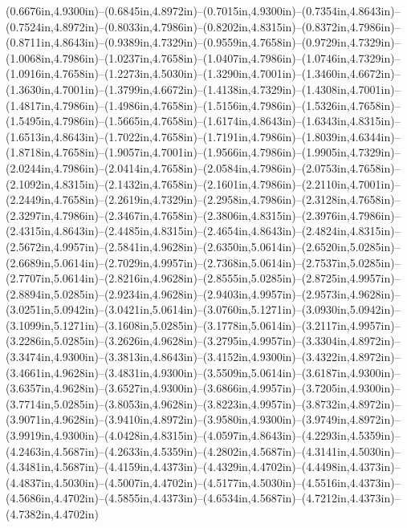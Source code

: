 (0.6676in,4.9300in)--(0.6845in,4.8972in)--(0.7015in,4.9300in)--(0.7354in,4.8643in)--(0.7524in,4.8972in)--(0.8033in,4.7986in)--(0.8202in,4.8315in)--(0.8372in,4.7986in)--(0.8711in,4.8643in)--(0.9389in,4.7329in)--(0.9559in,4.7658in)--(0.9729in,4.7329in)--(1.0068in,4.7986in)--(1.0237in,4.7658in)--(1.0407in,4.7986in)--(1.0746in,4.7329in)--(1.0916in,4.7658in)--(1.2273in,4.5030in)--(1.3290in,4.7001in)--(1.3460in,4.6672in)--(1.3630in,4.7001in)--(1.3799in,4.6672in)--(1.4138in,4.7329in)--(1.4308in,4.7001in)--(1.4817in,4.7986in)--(1.4986in,4.7658in)--(1.5156in,4.7986in)--(1.5326in,4.7658in)--(1.5495in,4.7986in)--(1.5665in,4.7658in)--(1.6174in,4.8643in)--(1.6343in,4.8315in)--(1.6513in,4.8643in)--(1.7022in,4.7658in)--(1.7191in,4.7986in)--(1.8039in,4.6344in)--(1.8718in,4.7658in)--(1.9057in,4.7001in)--(1.9566in,4.7986in)--(1.9905in,4.7329in)--(2.0244in,4.7986in)--(2.0414in,4.7658in)--(2.0584in,4.7986in)--(2.0753in,4.7658in)--(2.1092in,4.8315in)--(2.1432in,4.7658in)--(2.1601in,4.7986in)--(2.2110in,4.7001in)--(2.2449in,4.7658in)--(2.2619in,4.7329in)--(2.2958in,4.7986in)--(2.3128in,4.7658in)--(2.3297in,4.7986in)--(2.3467in,4.7658in)--(2.3806in,4.8315in)--(2.3976in,4.7986in)--(2.4315in,4.8643in)--(2.4485in,4.8315in)--(2.4654in,4.8643in)--(2.4824in,4.8315in)--(2.5672in,4.9957in)--(2.5841in,4.9628in)--(2.6350in,5.0614in)--(2.6520in,5.0285in)--(2.6689in,5.0614in)--(2.7029in,4.9957in)--(2.7368in,5.0614in)--(2.7537in,5.0285in)--(2.7707in,5.0614in)--(2.8216in,4.9628in)--(2.8555in,5.0285in)--(2.8725in,4.9957in)--(2.8894in,5.0285in)--(2.9234in,4.9628in)--(2.9403in,4.9957in)--(2.9573in,4.9628in)--(3.0251in,5.0942in)--(3.0421in,5.0614in)--(3.0760in,5.1271in)--(3.0930in,5.0942in)--(3.1099in,5.1271in)--(3.1608in,5.0285in)--(3.1778in,5.0614in)--(3.2117in,4.9957in)--(3.2286in,5.0285in)--(3.2626in,4.9628in)--(3.2795in,4.9957in)--(3.3304in,4.8972in)--(3.3474in,4.9300in)--(3.3813in,4.8643in)--(3.4152in,4.9300in)--(3.4322in,4.8972in)--(3.4661in,4.9628in)--(3.4831in,4.9300in)--(3.5509in,5.0614in)--(3.6187in,4.9300in)--(3.6357in,4.9628in)--(3.6527in,4.9300in)--(3.6866in,4.9957in)--(3.7205in,4.9300in)--(3.7714in,5.0285in)--(3.8053in,4.9628in)--(3.8223in,4.9957in)--(3.8732in,4.8972in)--(3.9071in,4.9628in)--(3.9410in,4.8972in)--(3.9580in,4.9300in)--(3.9749in,4.8972in)--(3.9919in,4.9300in)--(4.0428in,4.8315in)--(4.0597in,4.8643in)--(4.2293in,4.5359in)--(4.2463in,4.5687in)--(4.2633in,4.5359in)--(4.2802in,4.5687in)--(4.3141in,4.5030in)--(4.3481in,4.5687in)--(4.4159in,4.4373in)--(4.4329in,4.4702in)--(4.4498in,4.4373in)--(4.4837in,4.5030in)--(4.5007in,4.4702in)--(4.5177in,4.5030in)--(4.5516in,4.4373in)--(4.5686in,4.4702in)--(4.5855in,4.4373in)--(4.6534in,4.5687in)--(4.7212in,4.4373in)--(4.7382in,4.4702in)
